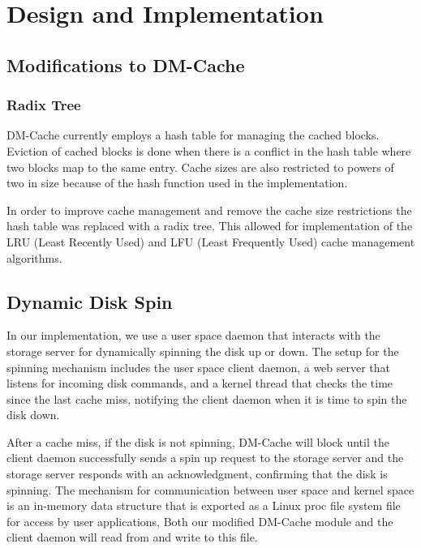 \section{Design and Implementation}
\label{sec:implementation}

\subsection{Modifications to DM-Cache}

\subsubsection{Radix Tree}

DM-Cache currently employs a hash table for managing the cached blocks. Eviction
of cached blocks is done when there is a conflict in the hash table where two
blocks map to the same entry. Cache sizes are also restricted to powers of two
in size because of the hash function used in the implementation.

In order to improve cache management and remove the cache size restrictions the
hash table was replaced with a radix tree. This allowed for implementation of
the LRU (Least Recently Used) and LFU (Least Frequently Used) cache management
algorithms.

\subsection{Dynamic Disk Spin}

In our implementation, we use a user space daemon that interacts with the
storage server for dynamically spinning the disk up or down. The setup for the
spinning mechanism includes the user space client daemon, a web server that
listens for incoming disk commands, and a kernel thread that checks the time
since the last cache miss, notifying the client daemon when it is time to spin
the disk down.

After a cache miss, if the disk is not spinning, DM-Cache will block until the
client daemon successfully sends a spin up request to the storage server and the
storage server responds with an acknowledgment, confirming that the disk is
spinning. The mechanism for communication between user space and kernel space is
an in-memory data structure that is exported as a Linux proc file system file
for access by user applications, Both our modified DM-Cache module and the
client daemon will read from and write to this file.

